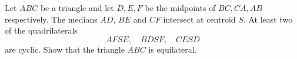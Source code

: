 Let $ABC$ be a triangle and let $D, E, F$ be the midpoints of $BC, CA, AB$ respectively.
The medians $AD$, $BE$ and $CF$ intersect at centroid $S$.
At least two of the quadrilaterals $$AFSE,\quad BDSF,\quad CESD$$ are cyclic.
Show that the triangle $ABC$ is equilateral.